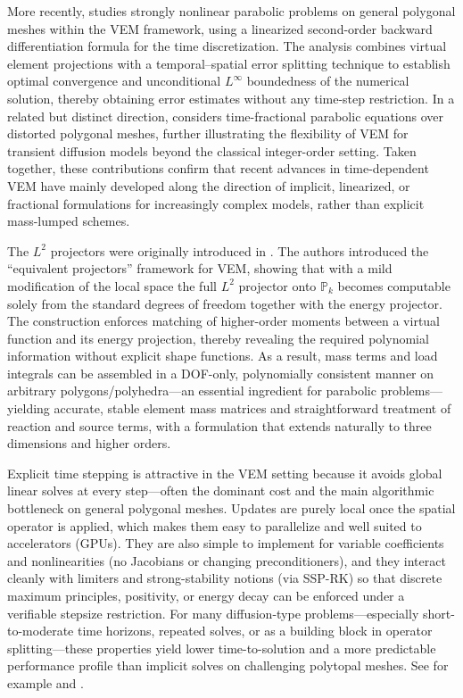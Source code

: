 \documentclass{article}
\begin{document}
More recently, \cite{wang2025bdf2} studies strongly nonlinear parabolic problems on general polygonal meshes within the VEM framework, using a linearized second-order backward differentiation formula for the time discretization. The analysis combines virtual element projections with a temporal--spatial error splitting technique to establish optimal convergence and unconditional $L^\infty$ boundedness of the numerical solution, thereby obtaining error estimates without any time-step restriction. In a related but distinct direction, \cite{dar2024timefractional} considers time-fractional parabolic equations over distorted polygonal meshes, further illustrating the flexibility of VEM for transient diffusion models beyond the classical integer-order setting. Taken together, these contributions confirm that recent advances in time-dependent VEM have mainly developed along the direction of implicit, linearized, or fractional formulations for increasingly complex models, rather than explicit mass-lumped schemes.

The $L^2$ projectors were originally introduced in \cite{ahmad2013projectors}. The authors introduced the “equivalent projectors” framework for VEM, showing that with a mild modification of the local space the full $L^2$ projector onto $\mathbb{P}_k$ becomes computable solely from the standard degrees of freedom together with the energy projector. The construction enforces matching of higher-order moments between a virtual function and its energy projection, thereby revealing the required polynomial information without explicit shape functions. As a result, mass terms and load integrals can be assembled in a DOF-only, polynomially consistent manner on arbitrary polygons/polyhedra—an essential ingredient for parabolic problems—yielding accurate, stable element mass matrices and straightforward treatment of reaction and source terms, with a formulation that extends naturally to three dimensions and higher orders.

Explicit time stepping is attractive in the VEM setting because it avoids global linear solves at every step—often the dominant cost and the main algorithmic bottleneck on general polygonal meshes. Updates are purely local once the spatial operator is applied, which makes them easy to parallelize and well suited to accelerators (GPUs). They are also simple to implement for variable coefficients and nonlinearities (no Jacobians or changing preconditioners), and they interact cleanly with limiters and strong-stability notions (via SSP-RK) so that discrete maximum principles, positivity, or energy decay can be enforced under a verifiable stepsize restriction. For many diffusion-type problems—especially short-to-moderate time horizons, repeated solves, or as a building block in operator splitting—these properties yield lower time-to-solution and a more predictable performance profile than implicit solves on challenging polytopal meshes. See for example \cite{alexiades1996super} and \cite{onate2024explicit}.
\end{document}
